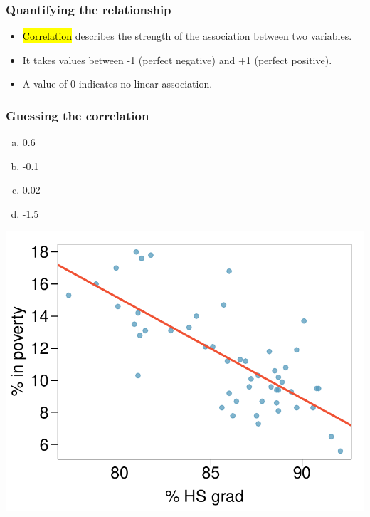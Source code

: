 
\begin{frame}
\frametitle{Quantifying the relationship}

\begin{itemize}

\item \hl{Correlation} describes the strength of the  association between two variables.

\pause

\item It takes values between -1 (perfect negative) and +1 (perfect positive).

\pause

\item A value of 0 indicates no linear association.

\end{itemize}

\end{frame}


\begin{frame}
\frametitle{Guessing the correlation}

{
\begin{enumerate}[(a)]
\item 0.6
\item -0.1
\item 0.02
\item -1.5
\end{enumerate}
}
{
\begin{center}
\includegraphics[width=\textwidth]{8-1_linefit_res_corr/figures/poverty/poverty_hsgrad_line}
\end{center}
}

\end{frame}

